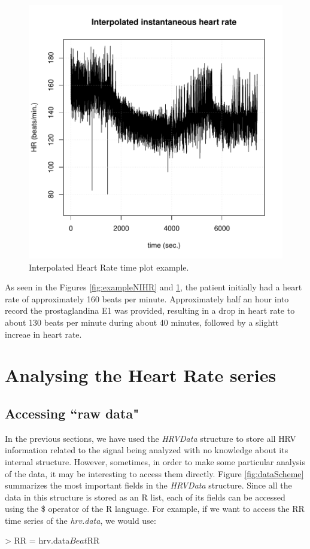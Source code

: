 \documentclass[12pt,lot, lof]{puthesis}
\begin{document}
\begin{figure}[h]
\centering
\includegraphics{figures/tutorial-plottingHR}
\caption{Interpolated Heart Rate time plot example.\label{fig:exampleHR}}
\end{figure}

As seen in the Figures \ref{fig:exampleNIHR} and \ref{fig:exampleHR}, the 
patient initially had a heart rate of approximately 160 beats per minute. 
Approximately half an hour into record the prostaglandina E1 was provided, 
resulting in a drop in heart rate to about 130 beats per minute during about 40 
minutes, followed by a slightt increae in heart rate.
\section{Analysing the Heart Rate series\label{sec:quickAna}}
\subsection{Accessing ``raw data"}
In the previous sections, we have used the 
\textit{HRVData}  structure  to store all \gls{HRV} information related to the 
signal being analyzed with no knowledge about its internal structure. However, 
sometimes, in order to make some particular analysis of the data, it may be 
interesting to access them directly. Figure \ref{fig:dataScheme} summarizes the 
most important fields in the
\textit{HRVData} structure. Since all the data in this structure is stored as 
an R list, each of its fields can be accessed using the \$ operator of the R 
language. For example, if we want to access the RR time series of the 
\textit{hrv.data}, we would use:
\begin{Schunk}
\begin{Sinput}
> RR = hrv.data$Beat$RR
\end{Sinput}
\end{Schunk}
\end{document}
